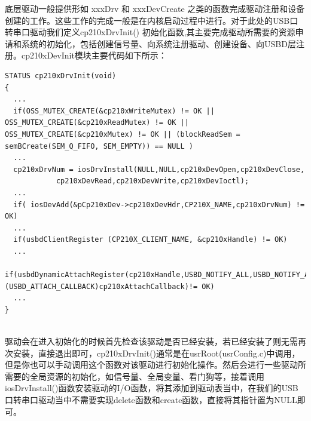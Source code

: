 	底层驱动一般提供形如 xxxDrv 和 xxxDevCreate 之类的函数完成驱动注册和设备创建的工作。这些工作的完成一般是在内核启动过程中进行。对于此处的USB口转串口驱动我们定义cp210xDrvInit() 初始化函数,其主要完成驱动所需要的资源申请和系统的初始化，包括创建信号量、向系统注册驱动、创建设备、向USBD层注册。cp210xDevInit模块主要代码如下所示：
\lstset{language=C}
\begin{lstlisting}
STATUS cp210xDrvInit(void)
{
  ...
  if(OSS_MUTEX_CREATE(&cp210xWriteMutex) != OK || OSS_MUTEX_CREATE(&cp210xReadMutex) != OK || OSS_MUTEX_CREATE(&cp210xMutex) != OK || (blockReadSem = semBCreate(SEM_Q_FIFO, SEM_EMPTY)) == NULL )
  ... 	
  cp210xDrvNum = iosDrvInstall(NULL,NULL,cp210xDevOpen,cp210xDevClose,
			cp210xDevRead,cp210xDevWrite,cp210xDevIoctl);
  ...
  if( iosDevAdd(&pCp210xDev->cp210xDevHdr,CP210X_NAME,cp210xDrvNum) != OK)
  ...  
  if(usbdClientRegister (CP210X_CLIENT_NAME, &cp210xHandle) != OK)
  ...  
  if(usbdDynamicAttachRegister(cp210xHandle,USBD_NOTIFY_ALL,USBD_NOTIFY_ALL,USBD_NOTIFY_ALL,TRUE,(USBD_ATTACH_CALLBACK)cp210xAttachCallback)!= OK)
  ...
}
\end{lstlisting}\\

	驱动会在进入初始化的时候首先检查该驱动是否已经安装，若已经安装了则无需再次安装，直接退出即可，cp210xDrvInit()通常是在usrRoot(usrConfig.c)中调用，但是你也可以手动调用这个函数对该驱动进行初始化操作。然后会进行一些驱动所需要的全局资源的初始化，如信号量、全局变量、看门狗等，接着调用iosDrvInstall()函数安装驱动的I/O函数，将其添加到驱动表当中，在我们的USB口转串口驱动当中不需要实现delete函数和create函数，直接将其指针置为NULL即可。
	
